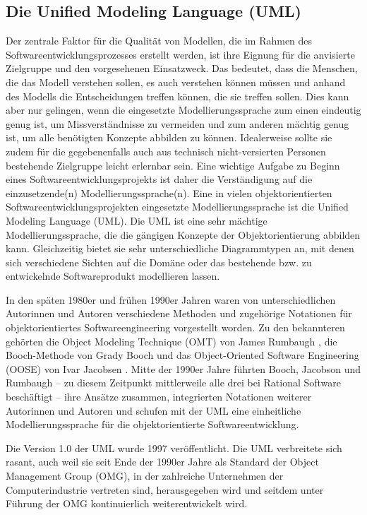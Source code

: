 \subsection{Die Unified Modeling Language (UML)}
\label{sec:Kap-3.2.3}

Der zentrale Faktor für die Qualität von Modellen, die im Rahmen des Softwareentwicklungsprozesses erstellt werden, ist ihre Eignung für die anvisierte Zielgruppe und den vorgesehenen Einsatzweck. Das bedeutet, dass die Menschen, die das Modell verstehen sollen, es auch verstehen können müssen und anhand des Modells die Entscheidungen treffen können, die sie treffen sollen. Dies kann aber nur gelingen, wenn die eingesetzte Modellierungssprache zum einen eindeutig genug ist, um Missverständnisse zu vermeiden und zum anderen mächtig genug ist, um alle benötigten Konzepte abbilden zu können. Idealerweise sollte sie zudem für die gegebenenfalls auch aus technisch nicht-versierten Personen bestehende Zielgruppe leicht erlernbar sein. Eine wichtige Aufgabe zu Beginn eines Softwareentwicklungsprojekts ist daher die Verständigung auf die einzusetzende(n) Modellierungssprache(n). Eine in vielen objektorientierten Softwareentwicklungsprojekten eingesetzte Modellierungssprache ist die Unified Modeling Language (UML). Die UML ist eine sehr mächtige Modellierungssprache, die die gängigen Konzepte der Objekt\-orien\-tierung abbilden kann. Gleichzeitig bietet sie sehr unterschiedliche Diagrammtypen an, mit denen sich verschiedene Sichten auf die Domäne oder das bestehende bzw. zu entwickelnde Softwareprodukt modellieren lassen. 

In den späten 1980er und frühen 1990er Jahren waren von unterschiedlichen Autorinnen und Autoren verschiedene Methoden und zugehörige Notationen für objekt\-orientiertes Softwareengineering vorgestellt worden. Zu den bekannteren gehörten die Object Modeling Technique (OMT) von James Rumbaugh  \cite{rum91}, die Booch-Methode von Grady Booch \cite{boo94} und das Object-Oriented Software Engineering (OOSE) von Ivar Jacobsen \cite{jac92}. Mitte der 1990er Jahre führten Booch, Jacobson und Rumbaugh – zu diesem Zeitpunkt mittlerweile alle drei bei Rational Software beschäftigt – ihre Ansätze zusammen, integrierten Notationen weiterer Autorinnen und Autoren und schufen mit der UML eine einheitliche Modellierungssprache für die objektorientierte Softwareentwicklung. 

Die Version 1.0 der UML wurde 1997 veröffentlicht. Die UML verbreitete sich \mbox{rasant}, auch weil sie seit Ende der 1990er Jahre als Standard der Object Management Group  (OMG), in der zahlreiche Unternehmen der Computerindustrie vertreten sind, herausgegeben wird und seitdem unter Führung der OMG kontinuierlich weiterent\-wickelt wird. 

